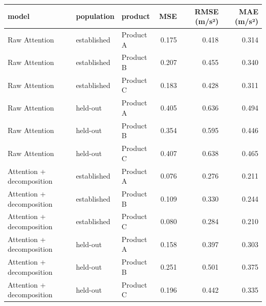 \begin{tabular}{lllrrr}
\toprule
model & population & product & MSE & RMSE (m/s²) & MAE (m/s²) \\
\midrule
Raw Attention & established & Product A & 0.175 & 0.418 & 0.314 \\
Raw Attention & established & Product B & 0.207 & 0.455 & 0.340 \\
Raw Attention & established & Product C & 0.183 & 0.428 & 0.311 \\
Raw Attention & held-out & Product A & 0.405 & 0.636 & 0.494 \\
Raw Attention & held-out & Product B & 0.354 & 0.595 & 0.446 \\
Raw Attention & held-out & Product C & 0.407 & 0.638 & 0.465 \\
Attention + decomposition & established & Product A & 0.076 & 0.276 & 0.211 \\
Attention + decomposition & established & Product B & 0.109 & 0.330 & 0.244 \\
Attention + decomposition & established & Product C & 0.080 & 0.284 & 0.210 \\
Attention + decomposition & held-out & Product A & 0.158 & 0.397 & 0.303 \\
Attention + decomposition & held-out & Product B & 0.251 & 0.501 & 0.375 \\
Attention + decomposition & held-out & Product C & 0.196 & 0.442 & 0.335 \\
\bottomrule
\end{tabular}
